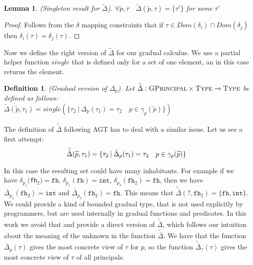 \documentclass{article}
\newcommand\icode[1]{\texttt{#1}}
\newcommand\wt[1]{\widetilde{#1}}
\newtheorem{lemma}{Lemma}
\newtheorem{definition}{Definition}[section]
\begin{document}
\begin{lemma}(Singleton result for $\wt{\Delta}$). $\forall \wt{p}, \tau \quad \wt{\Delta}(\wt{p},\tau) = \{\tau'\}$ for some $\tau'$
\end{lemma}
\begin{proof}
Follows from the $\delta$ mapping constraints that if $\tau \in Dom(\delta_i) \cap Dom(\delta_j)$ then $\delta_i(\tau) = \delta_j(\tau)$. 
\end{proof}

Now we define the right version of  $\wt{\Delta}$ for our gradual calculus. We use a partial helper function $single$ that is defined only for a set of one element, an in this case returns the element.

\begin{definition}(Gradual version of $\Delta_p$). Let $\wt{\Delta} : {\textsc{GPrincipal}} \times \textsc{Type} \rightarrow \textsc{Type}$ be defined as follows:\\
$\wt{\Delta}(\wt{p},\tau_1)= single(\{\tau_2 \:| \: \Delta_p(\tau_1) = \tau_2 \quad p \in \gamma_p(\wt{p})  \})$ \\
\end{definition}

The definition of $\wt{\bar{\Delta}}$ following AGT has to deal with a similar issue. Let us see a first attempt:
\[
\begin{tabular}{c}
$\wt{\bar{\Delta}}(\wt{p},\tau_1)= \{\tau_2 \:| \: \bar{\Delta}_p(\tau_1) = \tau_2 \quad p \in \gamma_p(\wt{p})\}$
\end{tabular}
\]

In this case the resulting set could have many inhabitants. For example if we have $\delta_{p_1}($\icode{fh}$_2) = \icode{fh}$,  $\delta_{p_1}(\icode{fh}) = \icode{int}$, $\delta_{p_2}(\icode{fh}_2) = \icode{fh}$, then we have $\bar{\Delta}_{p_1}(\icode{fh}_2) = \icode{int}$ and $\bar{\Delta}_{p_2}(\icode{fh}_2) = \icode{fh}$. This means that $\wt{\bar{\Delta}}(?,\icode{fh}_2) = \{\icode{fh}, \icode{int}\}$. We could provide a kind of bounded gradual type, that is not used explicitly by programmers, but are used internally in gradual functions and predicates. In this work we avoid that and provide a direct version of $\wt{\bar{\Delta}}$, which follows our intuition about the meaning of the unknown in the function $\wt{\bar{\Delta}}$. We have that the function $\bar{\Delta}_p(\tau)$ gives the most concrete view of $\tau$ for $p$, so the function $\wt{\bar{\Delta}}_?(\tau)$ gives the most concrete view of $\tau$ of all principals.
\end{document}
